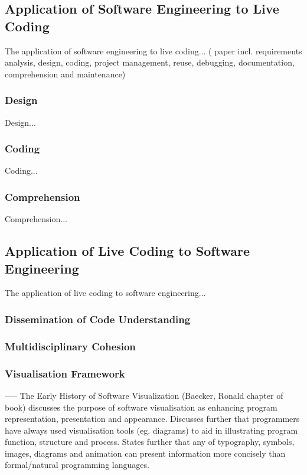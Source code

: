 \subsection{Application of Software Engineering to Live Coding}
The application of software engineering to live coding...
(\cite{Blackwell2005} paper incl. requirements analysis, design, coding, project management, reuse, debugging, documentation, comprehension and maintenance)

\subsubsection{Design}
Design...
\subsubsection{Coding}
Coding...
\subsubsection{Comprehension}
Comprehension...

\subsection{Application of Live Coding to Software Engineering}
The application of live coding to software engineering...

\subsubsection{Dissemination of Code Understanding}


\subsubsection{Multidisciplinary Cohesion}

\subsubsection{Visualisation Framework}






-----
The Early History of Software Visualization (Baecker, Ronald chapter of book) discusses the purpose of software visualisation as enhancing program representation, presentation and appearance. Discusses further that programmers have always used visualisation tools (eg. diagrams) to aid in illustrating program function, structure and process. States further that any of typography, symbols, images, diagrams and animation can present information more concisely than formal/natural programming languages. 

